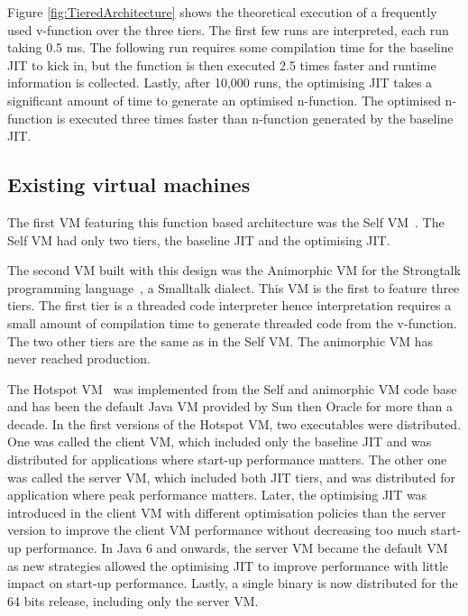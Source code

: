 \documentclass[a4paper,12pt,twoside]{../includes/ThesisStyle}
\begin{document}
Figure \ref{fig:TieredArchitecture} shows the theoretical execution of a frequently used v-function over the three tiers. The first few runs are interpreted, each run taking 0.5 ms. The following run requires some compilation time for the baseline JIT to kick in, but the function is then executed 2.5 times faster and runtime information is collected. Lastly, after 10,000 runs, the optimising JIT takes a significant amount of time to generate an optimised n-function. The optimised n-function is executed three times faster than n-function generated by the baseline JIT.

\subsection{Existing virtual machines}
\label{sec:existing1}

The first VM featuring this function based architecture was the Self VM~\cite{UrsPHD}. The Self VM had only two tiers, the baseline JIT and the optimising JIT. %

The second VM built with this design was the Animorphic VM for the Strongtalk programming language~\cite{Sun06}, a Smalltalk dialect. This VM is the first to feature three tiers. The first tier is a threaded code interpreter hence interpretation requires a small amount of compilation time to generate threaded code from the v-function. The two other tiers are the same as in the Self VM. The animorphic VM has never reached production.

The Hotspot VM~\cite{Pale01a} was implemented from the Self and animorphic VM code base and has been the default Java VM provided by Sun then Oracle for more than a decade. In the first versions of the Hotspot VM, two executables were distributed. One was called the client VM, which included only the baseline JIT and was distributed for applications where start-up performance matters. The other one was called the server VM, which included both JIT tiers, and was distributed for application where peak performance matters. Later, the optimising JIT was introduced in the client VM with different optimisation policies than the server version to improve the client VM performance without decreasing too much start-up performance. In Java 6 and onwards, the server VM became the default VM as new strategies allowed the optimising JIT to improve performance with little impact on start-up performance. Lastly, a single binary is now distributed for the 64 bits release, including only the server VM. 
\end{document}
